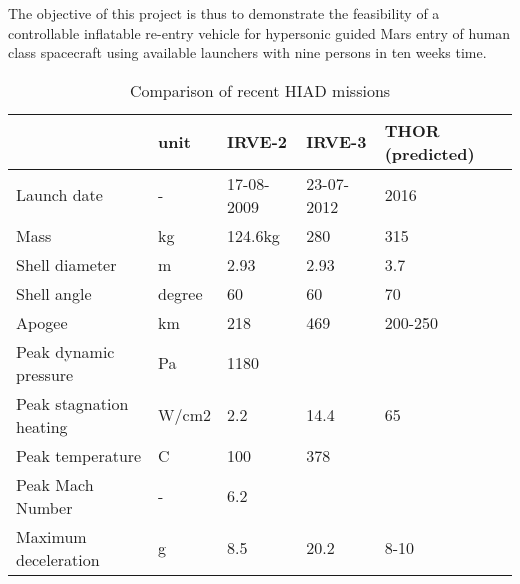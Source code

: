The objective of this project is thus to demonstrate the feasibility of a controllable inflatable re-entry vehicle for hypersonic guided Mars entry of human class spacecraft using available launchers with nine persons in ten weeks time.


\begin{table}[ht!]
	\caption{Comparison of recent HIAD missions}%
		\begin{tabular}{|p{}|p{}|p{}|p{}|p{}|} %
			\hline

           &       unit &     IRVE-2 \cite{irve2} &     IRVE-3 \citep{irve3} & THOR (predicted) \citep{thor} \\
			\hline

Launch date &          - & 17-08-2009 & 23-07-2012 &       2016 \\
			\hline

      Mass &         kg &    124.6kg &        280 &        315 \\
			\hline

Shell diameter &          m &       2.93 &       2.93 &        3.7 \\
			\hline

Shell angle &     degree &         60 &         60 &         70 \\
			\hline

    Apogee &         km &        218 &        469 &    200-250 \\
			\hline

Peak dynamic pressure &         Pa &       1180 &            &            \\
			\hline

Peak stagnation heating &      W/cm2 &        2.2 &       14.4 &         65 \\
			\hline

Peak temperature &          C &        100 &        378 &            \\
			\hline

Peak Mach Number &          - &        6.2 &            &            \\
			\hline

Maximum deceleration &          g &        8.5 &       20.2 &       8-10 \\
			\hline

		\end{tabular}
    \label{tab:hiadcomparison}%
\end{table}


